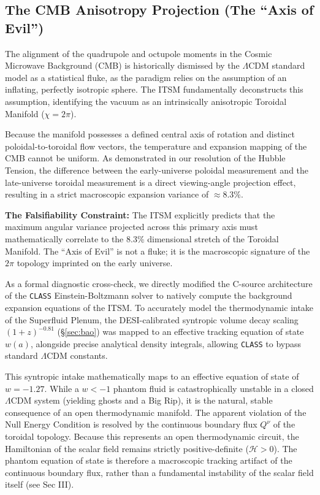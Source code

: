 \documentclass[aps,prd,10pt,twocolumn,superscriptaddress,nofootinbib,floatfix]{revtex4-2}
\begin{document}
\subsection{The CMB Anisotropy Projection (The ``Axis of Evil'')}
The alignment of the quadrupole and octupole moments in the Cosmic Microwave Background (CMB) \cite{axis_of_evil} is historically dismissed by the $\Lambda$CDM standard model as a statistical fluke, as the paradigm relies on the assumption of an inflating, perfectly isotropic sphere. The ITSM fundamentally deconstructs this assumption, identifying the vacuum as an intrinsically anisotropic Toroidal Manifold ($\chi=2\pi$).

Because the manifold possesses a defined central axis of rotation and distinct poloidal-to-toroidal flow vectors, the temperature and expansion mapping of the CMB cannot be uniform. As demonstrated in our resolution of the Hubble Tension, the difference between the early-universe poloidal measurement and the late-universe toroidal measurement is a direct viewing-angle projection effect, resulting in a strict macroscopic expansion variance of $\approx 8.3\%$.

\textbf{The Falsifiability Constraint:} The ITSM explicitly predicts that the maximum angular variance projected across this primary axis must mathematically correlate to the 8.3\% dimensional stretch of the Toroidal Manifold. The ``Axis of Evil'' is not a fluke; it is the macroscopic signature of the $2\pi$ topology imprinted on the early universe.

As a formal diagnostic cross-check, we directly modified the C-source architecture of the \texttt{CLASS} Einstein-Boltzmann solver \cite{class_code} to natively compute the background expansion equations of the ITSM. To accurately model the thermodynamic intake of the Superfluid Plenum, the DESI-calibrated syntropic volume decay scaling $(1+z)^{-0.81}$ (\S\ref{sec:bao}) was mapped to an effective tracking equation of state $w(a)$, alongside precise analytical density integrals, allowing \texttt{CLASS} to bypass standard $\Lambda$CDM constants.

This syntropic intake mathematically maps to an effective equation of state of $w = -1.27$. While a $w < -1$ phantom fluid is catastrophically unstable in a closed $\Lambda$CDM system (yielding ghosts and a Big Rip), it is the natural, stable consequence of an open thermodynamic manifold. The apparent violation of the Null Energy Condition is resolved by the continuous boundary flux $Q^\nu$ of the toroidal topology. Because this represents an open thermodynamic circuit, the Hamiltonian of the scalar field remains strictly positive-definite ($\mathcal{H} > 0$). The phantom equation of state is therefore a macroscopic tracking artifact of the continuous boundary flux, rather than a fundamental instability of the scalar field itself (see Sec III).
\end{document}
